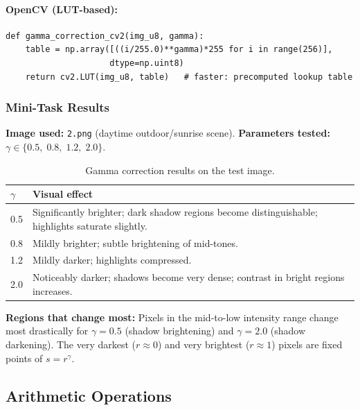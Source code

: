 \documentclass[12pt,a4paper]{article}
\begin{document}
\paragraph{OpenCV (LUT-based):}
\begin{lstlisting}
def gamma_correction_cv2(img_u8, gamma):
    table = np.array([((i/255.0)**gamma)*255 for i in range(256)],
                     dtype=np.uint8)
    return cv2.LUT(img_u8, table)   # faster: precomputed lookup table
\end{lstlisting}

\subsubsection*{Mini-Task Results}

\textbf{Image used:} \texttt{2.png} (daytime outdoor/sunrise scene).
\textbf{Parameters tested:} $\gamma \in \{0.5,\; 0.8,\; 1.2,\; 2.0\}$.

\begin{table}[H]
  \centering
  \begin{tabular}{@{}lp{9cm}@{}}
    \toprule
    $\gamma$ & Visual effect \\
    \midrule
    0.5 & Significantly brighter; dark shadow regions become distinguishable; highlights saturate slightly. \\
    0.8 & Mildly brighter; subtle brightening of mid-tones. \\
    1.2 & Mildly darker; highlights compressed. \\
    2.0 & Noticeably darker; shadows become very dense; contrast in bright regions increases. \\
    \bottomrule
  \end{tabular}
  \caption{Gamma correction results on the test image.}
\end{table}

\textbf{Regions that change most:} Pixels in the mid-to-low intensity range change
most drastically for $\gamma = 0.5$ (shadow brightening) and $\gamma = 2.0$
(shadow darkening). The very darkest ($r \approx 0$) and very brightest
($r \approx 1$) pixels are fixed points of $s = r^{\gamma}$.

\subsection{Arithmetic Operations}
\end{document}
